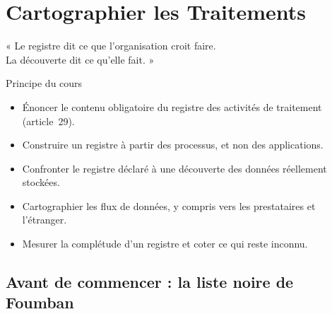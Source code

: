 
\chapter{Cartographier les Traitements}
\label{chap:cartographie}

\epigraph{%
    « Le registre dit ce que l'organisation croit faire.\\
    La découverte dit ce qu'elle fait. »%
}{Principe du cours}


\begin{boxobjectifs}
\begin{itemize}
    \item Énoncer le contenu obligatoire du registre des activités de
          traitement (article~29).
    \item Construire un registre à partir des processus, et non des
          applications.
    \item Confronter le registre déclaré à une découverte des données
          réellement stockées.
    \item Cartographier les flux de données, y compris vers les prestataires
          et l'étranger.
    \item Mesurer la complétude d'un registre et coter ce qui reste
          inconnu.
\end{itemize}
\end{boxobjectifs}

\bigskip

\section*{Avant de commencer : la liste noire de Foumban}

